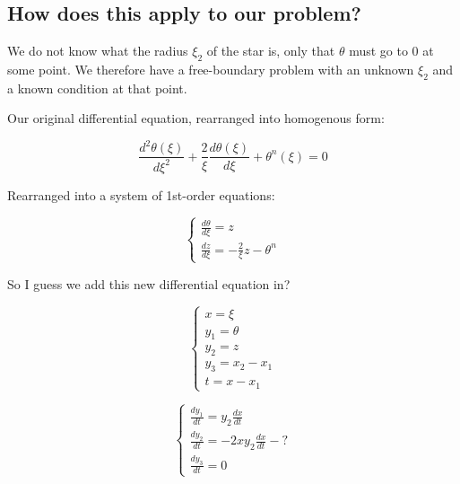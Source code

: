 \documentclass{article}
\begin{document}
    \subsection{How does this apply to our problem?}

        We do not know what the radius \(\xi_2\) of the star is, only that
        \(\theta\) must go to 0 at some point. We therefore have a free-boundary
        problem with an unknown \(\xi_2\) and a known condition at that point.

        Our original differential equation, rearranged into homogenous form:

        \begin{equation}
            \frac{d^2\theta(\xi)}{d\xi^2} +
            \frac{2}{\xi}\frac{d\theta(\xi)}{d\xi} + \theta^n(\xi)=0
        \end{equation}

        Rearranged into a system of 1st-order equations:

        \begin{equation}
            \left\{
            \begin{array}{l}
                \frac{d\theta}{d\xi}=z \\
                \frac{dz}{d\xi}=-\frac{2}{\xi}z-\theta^n
            \end{array}\right.
        \end{equation}

        So I guess we add this new differential equation in?

        \[
            \left\{
            \begin{array}{l}
                x=\xi \\
                y_1=\theta \\
                y_2=z \\
                y_3=x_2-x_1 \\
                t=x-x_1
            \end{array}
            \right.
        \]

        \begin{equation}
            \left\{
            \begin{array}{l}
                \frac{dy_1}{dt}=y_2\frac{dx}{dt} \\
                \frac{dy_2}{dt}=-2x y_2\frac{dx}{dt}-? \\
                \frac{dy_3}{dt}=0
            \end{array}
            \right.
        \end{equation}
\end{document}

